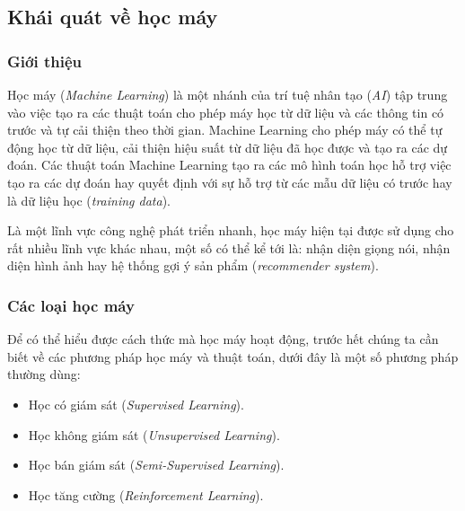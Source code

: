 \subsection{Khái quát về học máy}
\subsubsection{Giới thiệu}
Học máy (\textit{Machine Learning}) là một nhánh của trí tuệ nhân tạo (\textit{AI}) tập trung vào việc tạo ra các thuật toán cho phép máy học từ dữ liệu và các thông tin có trước và tự cải thiện theo thời gian. Machine Learning cho phép máy có thể tự động học từ dữ liệu, cải thiện hiệu suất từ dữ liệu đã học được và tạo ra các dự đoán. Các thuật toán Machine Learning tạo ra các mô hình toán học hỗ trợ việc tạo ra các dự đoán hay quyết định với sự hỗ trợ từ các mẫu dữ liệu có trước hay là dữ liệu học (\textit{training data}).\cite{webpage}

Là một lĩnh vực công nghệ phát triển nhanh, học máy hiện tại được sử dụng cho rất nhiều lĩnh vực khác nhau, một số có thể kể tới là: nhận diện giọng nói, nhận diện hình ảnh hay hệ thống gợi ý sản phẩm (\textit{recommender system}).

\subsubsection{Các loại học máy}
Để có thể hiểu được cách thức mà học máy hoạt động, trước hết chúng ta cần biết về các phương pháp học máy và thuật toán, dưới đây là một số phương pháp thường dùng\cite{webpage}:
\begin{itemize}
    \item Học có giám sát (\textit{Supervised Learning}).
    \item Học không giám sát (\textit{Unsupervised Learning}).
    \item Học bán giám sát (\textit{Semi-Supervised Learning}).
    \item Học tăng cường (\textit{Reinforcement Learning}).
\end{itemize}

